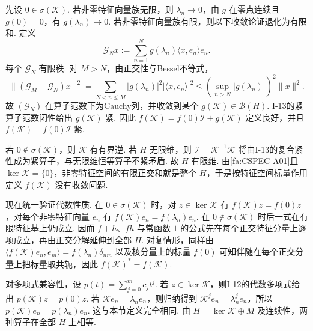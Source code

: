 \begin{FAProof}
先设 \(\displaystyle0\in\sigma(\mathcal K)\). 若非零特征向量族无限，则 \(\displaystyle \lambda_n\to0\)，由 \(\displaystyle g\) 在零点连续且 \(\displaystyle g(0)=0\)，有 \(\displaystyle g(\lambda_n)\to0\). 若非零特征向量族有限，则以下收敛论证退化为有限和. 定义
\[
\mathcal G_Nx
:=
\sum_{n=1}^{N}
g(\lambda_n)\langle x,e_n\rangle e_n.
\]
每个 \(\displaystyle \mathcal G_N\) 有限秩. 对 \(\displaystyle M>N\)，由正交性与Bessel不等式，
\[
\|(\mathcal G_M-\mathcal G_N)x\|^2 = \sum_{N<n\leqslant M} |g(\lambda_n)|^2|\langle x,e_n\rangle|^2 \leqslant \left(\sup_{n>N}|g(\lambda_n)|\right)^2\|x\|^2.
\]
故 \(\displaystyle (\mathcal G_N)\) 在算子范数下为Cauchy列，并收敛到某个 \(\displaystyle g(\mathcal K)\in\mathcal B(H)\). I-13的紧算子范数闭性给出 \(\displaystyle g(\mathcal K)\) 紧. 因此 \(\displaystyle f(\mathcal K)=f(0)\mathcal I+g(\mathcal K)\) 定义良好，并且 \(\displaystyle f(\mathcal K)-f(0)\mathcal I\) 紧.

若 \(\displaystyle0\notin\sigma(\mathcal K)\)，则 \(\displaystyle \mathcal K\) 有有界逆. 若 \(\displaystyle H\) 无限维，则 \(\displaystyle \mathcal I=\mathcal K^{-1}\mathcal K\) 将由I-13的复合紧性成为紧算子，与无限维恒等算子不紧矛盾. 故 \(\displaystyle H\) 有限维. 由\autoref{fa:CSPEC-A01}且 \(\displaystyle \ker\mathcal K=\{0\}\)，非零特征空间的有限正交和就是整个 \(\displaystyle H\)，于是按特征空间标量作用定义 \(\displaystyle f(\mathcal K)\) 没有收敛问题.

现在统一验证代数性质. 在 \(\displaystyle0\in\sigma(\mathcal K)\) 时，对 \(\displaystyle z\in\ker\mathcal K\) 有 \(\displaystyle f(\mathcal K)z=f(0)z\)，对每个非零特征向量 \(\displaystyle e_n\) 有 \(\displaystyle f(\mathcal K)e_n=f(\lambda_n)e_n\).
在 \(\displaystyle0\notin\sigma(\mathcal K)\) 时后一式在有限特征基上仍成立. 因而 \(\displaystyle f+h\)、\(\displaystyle fh\) 与常函数 \(\displaystyle1\) 的公式先在每个正交特征分量上逐项成立，再由正交分解延伸到全部 \(\displaystyle H\). 对复情形，同样由 \(\displaystyle \langle f(\mathcal K)e_n,e_m\rangle=f(\lambda_n)\delta_{nm}\) 以及核分量上的标量 \(\displaystyle f(0)\) 可知伴随在每个正交分量上把标量取共轭，因此 \(\displaystyle f(\mathcal K)^*=\overline f(\mathcal K)\).

对多项式兼容性，设 \(\displaystyle p(t)=\sum_{j=0}^{m}c_jt^j\). 若 \(\displaystyle z\in\ker\mathcal K\)，则I-12的代数多项式给出 \(\displaystyle p(\mathcal K)z=p(0)z\). 若 \(\displaystyle \mathcal Ke_n=\lambda_ne_n\)，则归纳得到 \(\displaystyle \mathcal K^je_n=\lambda_n^je_n\)，所以 \(\displaystyle p(\mathcal K)e_n=p(\lambda_n)e_n\).
这与本节定义完全相同. 由 \(\displaystyle H=\ker\mathcal K\oplus M\) 及连续性，两种算子在全部 \(\displaystyle H\) 上相等.


\end{FAProof}
